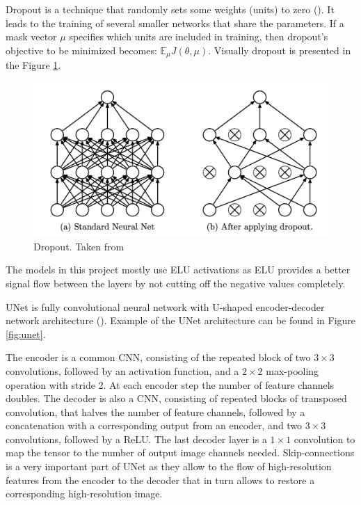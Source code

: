 \begin{definition}
	Dropout is a technique that randomly sets some weights (units) to zero (\cite{Srivastava_2014}). It leads to the training of several smaller networks that share the parameters. If a mask vector $\mu$ specifies which units are included in training, then dropout's objective to be minimized becomes: $\mathbb{E}_\mu J(\theta, \mu)$. Visually dropout is presented in the Figure \ref{fig:dropout}.
\end{definition}

\begin{figure}[H]
	\begin{center}
		\includegraphics[width=0.5\linewidth]{bilder/dropout.png}
		\caption[Dropout]%
		{Dropout. Taken from \cite{Srivastava_2014}}
		\label{fig:dropout}
	\end{center}
\end{figure}

The models in this project mostly use ELU activations as ELU provides a better signal flow between the layers by not cutting off the negative values completely.

\begin{definition}[UNet]
	UNet is fully convolutional neural network with U-shaped encoder-decoder network architecture (\cite{Ronneberger_2015}). Example of the UNet architecture can be found in Figure \ref{fig:unet}.
\end{definition}

The encoder is a common CNN, consisting of the repeated
block of two $3 \times 3$ convolutions, followed by
an activation function, and a $2 \times 2$ max-pooling operation with stride 2. At each encoder step  the number of feature channels doubles. The decoder is also a CNN, consisting of repeated blocks of transposed convolution, that halves the number of feature channels, followed by a concatenation with a corresponding output from an encoder, and two $3 \times 3$ convolutions, followed by a ReLU. The last decoder layer is a $1 \times 1$ convolution to map the tensor to the number of output image channels needed. Skip-connections is a very important part of UNet as they allow to the flow of high-resolution features from the encoder to the decoder that in turn allows to restore a corresponding high-resolution image.

